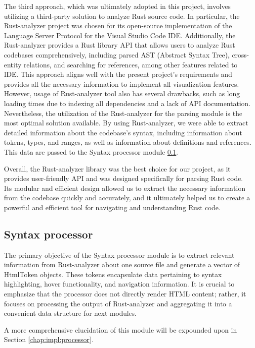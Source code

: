 The third approach, which was ultimately adopted in this project, involves utilizing a third-party solution to analyze Rust source code. In particular, the Rust-analyzer \cite{crates-rust-analyzer} project was chosen for its open-source implementation of the Language Server Protocol \cite{lsp} for the Visual Studio Code IDE. Additionally, the Rust-analyzer provides a Rust library API that allows users to analyze Rust codebases comprehensively, including parsed AST (Abstract Syntax Tree), cross-entity relations, and searching for references, among other features related to IDE. This approach aligns well with the present project's requirements and provides all the necessary information to implement all visualization features. However, usage of Rust-analyzer tool also has several drawbacks, such as long loading times due to indexing all dependencies and a lack of API documentation. Nevertheless, the utilization of the Rust-analyzer for the parsing module is the most optimal solution available. By using Rust-analyzer, we were able to extract detailed information about the codebase's syntax, including information about tokens, types, and ranges, as well as information about definitions and references. This data are passed to the Syntax processor module \ref{chap:modules:processor}.

Overall, the Rust-analyzer library was the best choice for our project, as it provides user-friendly API and was designed specifically for parsing Rust code. Its modular and efficient design allowed us to extract the necessary information from the codebase quickly and accurately, and it ultimately helped us to create a powerful and efficient tool for navigating and understanding Rust code.

\subsection{Syntax processor}
\label{chap:modules:processor}
The primary objective of the Syntax processor module is to extract relevant information from Rust-analyzer about one source file and generate a vector of HtmlToken objects. These tokens encapsulate data pertaining to syntax highlighting, hover functionality, and navigation information. It is crucial to emphasize that the processor does not directly render HTML content; rather, it focuses on processing the output of Rust-analyzer and aggregating it into a convenient data structure for next modules.

A more comprehensive elucidation of this module will be expounded upon in Section \ref{chap:impl:processor}.


